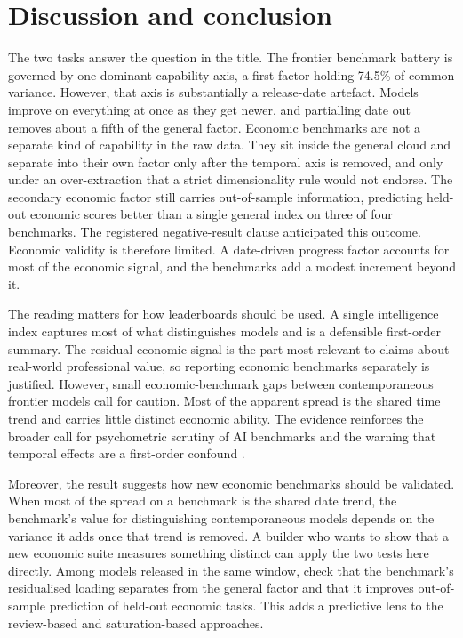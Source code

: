 \section{Discussion and conclusion}\label{sec:discussion}
The two tasks answer the question in the title. The frontier benchmark battery is governed by one
dominant capability axis, a first factor holding 74.5\% of common variance. However, that axis is
substantially a release-date artefact. Models improve on everything at once as they get newer, and
partialling date out removes about a fifth of the general factor. Economic benchmarks are
not a separate kind of capability in the raw data. They sit inside the general cloud and separate into
their own factor only after the temporal axis is removed, and only under an over-extraction that a
strict dimensionality rule would not endorse. The secondary economic factor still carries out-of-sample
information, predicting held-out economic scores better than a single general index on three of four
benchmarks. The registered negative-result clause anticipated this outcome. Economic validity is
therefore limited. A date-driven progress factor accounts for most of the economic signal, and the
benchmarks add a modest increment beyond it.

The reading matters for how leaderboards should be used. A single intelligence index captures most of
what distinguishes models and is a defensible first-order summary. The residual economic signal is the
part most relevant to claims about real-world professional value, so reporting economic benchmarks
separately is justified. However, small economic-benchmark gaps between contemporaneous frontier models
call for caution. Most of the apparent spread is the shared time trend and carries little distinct
economic ability. The evidence reinforces the broader call for psychometric scrutiny of AI benchmarks
\cite{bean2025,kearns2026} and the warning that temporal effects are a first-order confound
\cite{akhtar2026}.

Moreover, the result suggests how new economic benchmarks should be validated. When most of the spread on a
benchmark is the shared date trend, the benchmark's value for distinguishing contemporaneous models
depends on the variance it adds once that trend is removed. A builder who wants to show that a new
economic suite measures something distinct can apply the two tests here directly. Among models released
in the same window, check that the benchmark's residualised loading separates from the general factor
and that it improves out-of-sample prediction of held-out economic tasks. This adds a predictive lens to
the review-based \cite{bean2025} and saturation-based \cite{akhtar2026} approaches.

